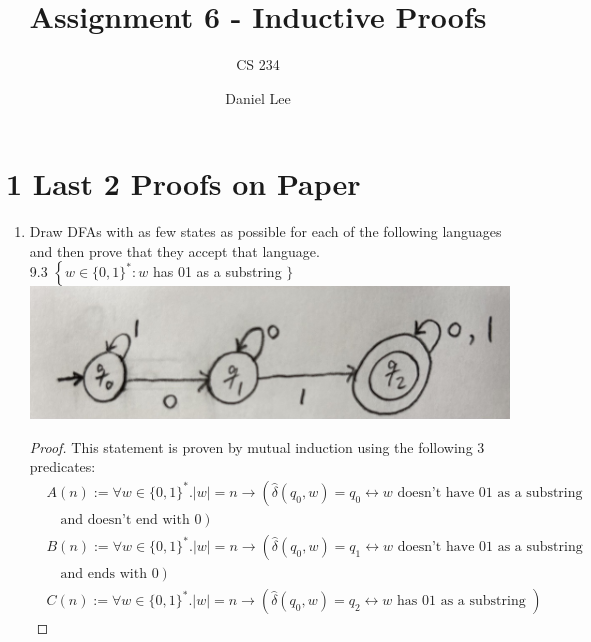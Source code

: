 \documentclass[10pt]{article}
\title{Assignment 6 - Inductive Proofs}
\author{CS 234}
\date{Daniel Lee}
\begin{document}
\maketitle

\section*{1 \quad Last 2 Proofs on Paper}

\begin{enumerate}[label={}]
      \item Draw DFAs with as few states as possible for each of the following languages and then prove that they accept that language.\\

            9.3 $\left\{w \in\{0,1\}^*: w\right.$ has 01 as a substring $\}$\\
            \includegraphics[scale=0.1]{9.3}
            \begin{proof}
                  This statement is proven by mutual induction using the following 3 predicates:\\
                  $$
                        \begin{aligned}
                               & A(n):=\forall w \in\{0,1\}^* .|w|=n \rightarrow\left(\hat{\delta}\left(q_0, w\right)=q_0 \leftrightarrow w \text { doesn't have 01 as a substring} \right. \\
                               & \quad \left. \text{and doesn't end with } 0\right)                                                                                                         \\
                               & B(n):=\forall w \in\{0,1\}^* .|w|=n \rightarrow\left(\hat{\delta}\left(q_0, w\right)=q_1 \leftrightarrow w \text { doesn't have 01 as a substring} \right. \\
                               & \quad \left. \text{and ends with } 0\right)                                                                                                                \\
                               & C(n):=\forall w \in\{0,1\}^* .|w|=n \rightarrow\left(\hat{\delta}\left(q_0, w\right)=q_2 \leftrightarrow w \text { has 01 as a substring }\right)
                        \end{aligned}
                  $$


\end{proof}
\end{enumerate}
\end{document}
